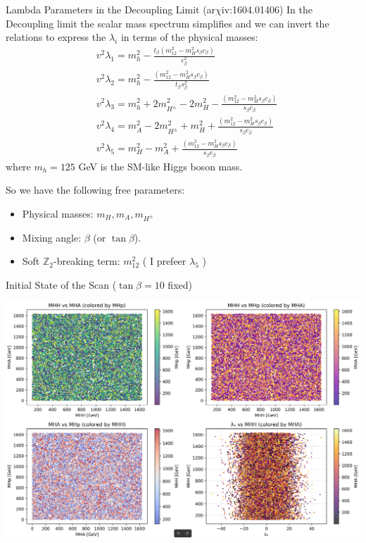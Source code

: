 \documentclass{../bredelebeamer}
\newcommand{\arxiv}{ar$\chi$iv:}
\begin{document}
\begin{frame}{Lambda Parameters in the Decoupling Limit (\arxiv 1604.01406)}
  In the Decoupling limit the scalar mass spectrum simplifies and we can invert the relations to express the $\lambda_i$ in terms of the physical masses:
  \begin{equation}
      \begin{aligned}
        & v^2 \lambda_1=m_h^2-\frac{t_\beta\left(m_{12}^2-m_H^2 s_\beta c_\beta\right)}{c_\beta^2} \\
        & v^2 \lambda_2=m_h^2-\frac{\left(m_{12}^2-m_H^2 s_\beta c_\beta\right)}{t_\beta s_\beta^2} \\
        & v^2 \lambda_3=m_h^2+2 m_{H^{ \pm}}^2-2 m_H^2-\frac{\left(m_{12}^2-m_H^2 s_\beta c_\beta\right)}{s_\beta c_\beta} \\
        & v^2 \lambda_4=m_A^2-2 m_{H^{ \pm}}^2+m_H^2+\frac{\left(m_{12}^2-m_H^2 s_\beta c_\beta\right)}{s_\beta c_\beta} \\
        & v^2 \lambda_5=m_H^2-m_A^2+\frac{\left(m_{12}^2-m_H^2 s_\beta c_\beta\right)}{s_\beta c_\beta}
        \end{aligned}
    \end{equation}
    where $m_h = 125$ GeV is the SM-like Higgs boson mass.\vfill \pause

    So we have the following free parameters:
    \begin{itemize}
      \item Physical masses: $m_H, m_A, m_{H^\pm}$
      \item Mixing angle: $\beta$ (or $\tan\beta$).
      \item Soft $\mathbb{Z}_2$-breaking term: $m_{12}^2$ ( I prefeer $\lambda_5$ )
    \end{itemize}
\end{frame}

\begin{frame}{Initial State of the Scan ($\tan\beta=10$ fixed)}
  \begin{center}
    \includegraphics[width=\textwidth]{Initial_THDM_param_scan_analysis}
  \end{center}
\end{frame}
\end{document}
